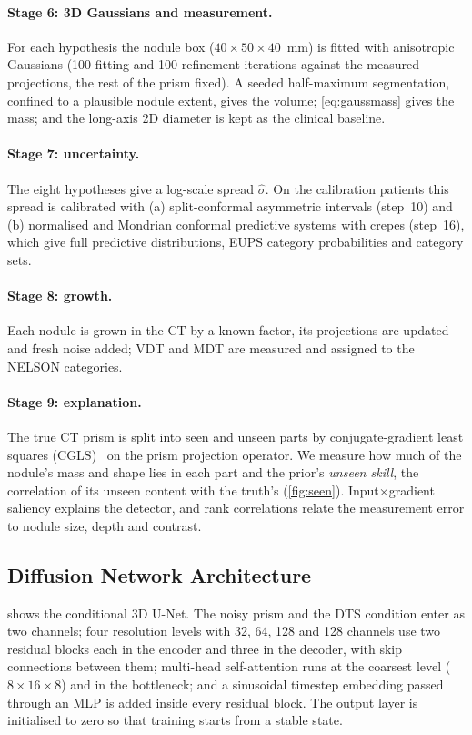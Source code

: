 \paragraph{Stage 6: 3D Gaussians and measurement.} For each hypothesis the nodule box ($40\times50\times40$~mm) is fitted with anisotropic Gaussians (100 fitting and 100 refinement iterations against the measured projections, the rest of the prism fixed). A seeded half-maximum segmentation, confined to a plausible nodule extent, gives the volume; \cref{eq:gaussmass} gives the mass; and the long-axis 2D diameter is kept as the clinical baseline.

\paragraph{Stage 7: uncertainty.} The eight hypotheses give a log-scale spread $\hat\sigma$. On the calibration patients this spread is calibrated with (a) split-conformal asymmetric intervals (step~10) and (b) normalised and Mondrian conformal predictive systems with crepes (step~16), which give full predictive distributions, EUPS category probabilities and category sets.

\paragraph{Stage 8: growth.} Each nodule is grown in the CT by a known factor, its projections are updated and fresh noise added; VDT and MDT are measured and assigned to the NELSON categories.

\paragraph{Stage 9: explanation.} The true CT prism is split into seen and unseen parts by conjugate-gradient least squares (CGLS)~\cite{hestenes1952cg} on the prism projection operator. We measure how much of the nodule's mass and shape lies in each part and the prior's \emph{unseen skill}, the correlation of its unseen content with the truth's (\cref{fig:seen}). Input$\times$gradient saliency explains the detector, and rank correlations relate the measurement error to nodule size, depth and contrast.

\subsection{Diffusion Network Architecture}

 shows the conditional 3D U-Net. The noisy prism and the DTS condition enter as two channels; four resolution levels with 32, 64, 128 and 128 channels use two residual blocks each in the encoder and three in the decoder, with skip connections between them; multi-head self-attention runs at the coarsest level ($8{\times}16{\times}8$) and in the bottleneck; and a sinusoidal timestep embedding passed through an MLP is added inside every residual block. The output layer is initialised to zero so that training starts from a stable state.

